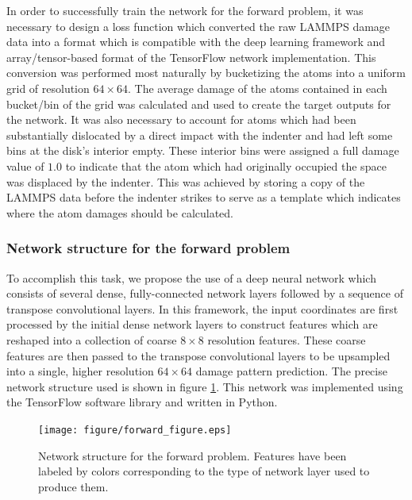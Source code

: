 In order to successfully train the network for the forward problem, it was necessary to design a loss function which converted the raw LAMMPS damage data into a format which is compatible with the deep learning framework and array/tensor-based format of the TensorFlow network implementation.  This conversion was performed most naturally by bucketizing the atoms into a uniform grid of resolution $64 \times 64$.  The average damage of the atoms contained in each bucket/bin of the grid was calculated and used to create the target outputs for the network.  It was also necessary to account for atoms which had been substantially dislocated by a direct impact with the indenter and had left some bins at the disk's interior empty.  These interior bins were assigned a full damage value of $1.0$ to indicate that the atom which had originally occupied the space was displaced by the indenter.  This was achieved by storing a copy of the LAMMPS data before the indenter strikes to serve as a template which indicates where the atom damages should be calculated.


\subsubsection{Network structure for the forward problem}
\label{forward_network}

To accomplish this task, we propose the use of a deep neural network which consists of several dense, fully-connected network layers followed by a sequence of transpose convolutional layers.  In this framework, the input coordinates are first processed by the initial dense network layers to construct features which are reshaped into a collection of coarse $8 \times 8$ resolution features.  These coarse features are then passed to the transpose convolutional layers to be upsampled into a single, higher resolution $64 \times 64$ damage pattern prediction.  The precise network structure used is shown in figure \ref{fig:forward}.  This network was implemented using the TensorFlow software library and written in Python.

\begin{figure}
  \centering
  \texttt{[image: figure/forward\_figure.eps]}
\caption{Network structure for the forward problem.  Features have been labeled by colors corresponding to the type of network layer used to produce them.}
\label{fig:forward}       
\end{figure}

